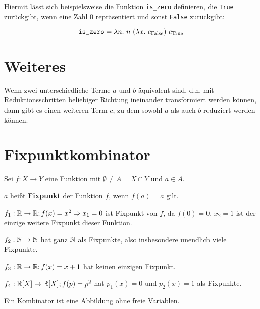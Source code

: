 Hiermit lässt sich beispielsweise die Funktion \texttt{is\_zero} definieren, die
\texttt{True} zurückgibt, wenn eine Zahl $0$ repräsentiert und sonst \texttt{False}
zurückgibt:

\[ \text{\texttt{is\_zero}} = \lambda n.\ n\ (\lambda x.\ c_{\text{False}})\ c_{\text{True}}\]

\section{Weiteres}
\begin{satz}
    Wenn zwei unterschiedliche Terme $a$ und $b$ äquivalent sind, d.h. mit Reduktionsschritten beliebiger Richtung ineinander transformiert werden können, dann gibt es einen weiteren Term $c$, zu dem sowohl $a$ als auch $b$ reduziert werden können.
\end{satz}

\section{Fixpunktkombinator}
\begin{definition}[Fixpunkt]%
    Sei $f: X \rightarrow Y$ eine Funktion mit $\emptyset \neq A = X \cap Y$ und
    $a \in A$.

    $a$ heißt \textbf{Fixpunkt} der Funktion $f$, wenn $f(a) = a$ gilt.
\end{definition}

\begin{beispiel}[Fixpunkt]
    \begin{bspenum}
        \item $f_1: \mathbb{R} \rightarrow \mathbb{R}; f(x) = x^2 \Rightarrow x_1 = 0$ ist
              Fixpunkt von $f$, da $f(0) = 0$. $x_2 = 1$ ist der einzige weitere
              Fixpunkt dieser Funktion.
        \item $f_2: \mathbb{N} \rightarrow \mathbb{N}$ hat ganz $\mathbb{N}$ als Fixpunkte, also
              insbesondere unendlich viele Fixpunkte.
        \item $f_3: \mathbb{R} \rightarrow \mathbb{R}; f(x) = x+1$ hat keinen einzigen Fixpunkt.
        \item $f_4: \mathbb{R}[X] \rightarrow \mathbb{R}[X]; f(p) = p^2$ hat $p_1(x) = 0$ und
              $p_2(x)=1$ als Fixpunkte.
    \end{bspenum}
\end{beispiel}

\begin{definition}[Kombinator]%
    Ein Kombinator ist eine Abbildung ohne freie Variablen.
\end{definition}

